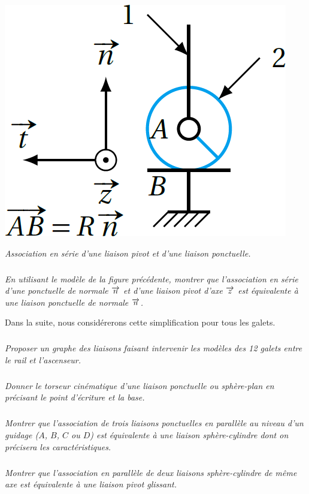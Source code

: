 \documentclass[10pt,fleqn]{article} %
\begin{document}
\begin{multicols}{2}
\begin{multicols}{2}
\begin{center}
\includegraphics[width=.6\linewidth]{images/fig_04}

\textit{Association en série d'une liaison pivot et d'une liaison  ponctuelle.}
\end{center}

%

\subparagraph{}\textit{En utilisant le modèle de la figure précédente,
    montrer que l'association en série d'une ponctuelle de normale
    $\overrightarrow{n}$ et d'une liaison pivot d'axe $\overrightarrow{z}$ est équivalente à
    une liaison ponctuelle de normale $\overrightarrow{n}$.}

Dans la suite, nous considérerons cette simplification pour tous les galets.

\subparagraph{}\textit{Proposer un graphe des liaisons faisant intervenir les modèles des 12 galets entre le rail et l'ascenseur.}

\subparagraph{}\textit{Donner le torseur cinématique d'une liaison ponctuelle ou sphère-plan en précisant le point d'écriture et la base.}

\subparagraph{}\textit{Montrer que l'association de trois liaisons ponctuelles en parallèle au niveau d'un guidage ($A$, $B$, $C$ ou $D$) est équivalente à une liaison sphère-cylindre dont on précisera les caractéristiques.}

\subparagraph{}\textit{Montrer que l'association en parallèle de deux liaisons sphère-cylindre de même axe est équivalente à une liaison pivot glissant.}



\end{multicols}
\end{multicols}
\end{document}

